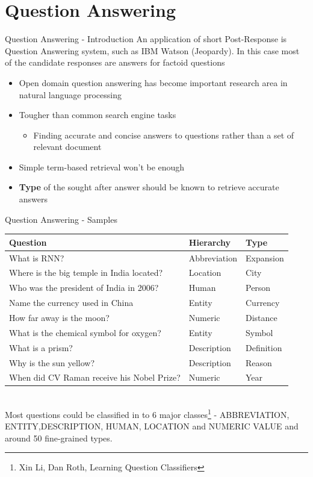 
\section{Question Answering}


\begin{frame}{Question Answering - Introduction }
An application of short Post-Response is Question Answering system, such as IBM Watson (Jeopardy).
In this case most of the candidate responses are answers for factoid questions
\begin{itemize}
	\item Open domain  question  answering  has become important research area in natural language processing
	\item Tougher than  common  search  engine  tasks
	\begin{itemize}
		\item Finding accurate and concise answers  to  questions rather  than  a  set of relevant  document
	\end{itemize}
	\item Simple term-based retrieval won't be enough
	\item \textbf{Type} of the sought after answer should be known to retrieve accurate answers
\end{itemize}

\end{frame}

\begin{frame}{Question Answering - Samples}
	\begin{tabular}{p{8cm}|p{3cm}|p{3cm}}
		Question&Hierarchy&Type\\
		\hline
		What is RNN?&Abbreviation&Expansion\\
		Where is the big temple in India located?&Location&City\\
		Who was the president of India in 2006?&Human&Person\\
		Name the currency used in China&Entity&Currency\\
		How far away is the moon?&Numeric&Distance\\
		What is the chemical symbol for oxygen?&Entity&Symbol\\
		What is a prism?&Description&Definition\\
		Why is the sun yellow?&Description&Reason\\
		When did CV Raman receive his Nobel Prize?&Numeric&Year\\
		\hline
	\end{tabular}\\
Most questions could be classified in to 6 major classes\footnote{Xin Li, Dan Roth, Learning Question Classifiers} - ABBREVIATION, ENTITY,DESCRIPTION, HUMAN,  LOCATION and  NUMERIC VALUE and around 50 fine-grained types.
\end{frame}

